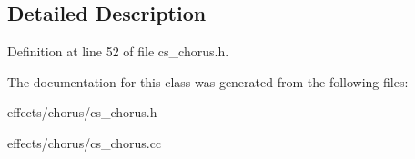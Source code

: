 \subsection{Detailed Description}


Definition at line 52 of file cs\+\_\+chorus.\+h.



The documentation for this class was generated from the following files\+:\begin{DoxyCompactItemize}
\item 
effects/chorus/cs\+\_\+chorus.\+h\item 
effects/chorus/cs\+\_\+chorus.\+cc\end{DoxyCompactItemize}
